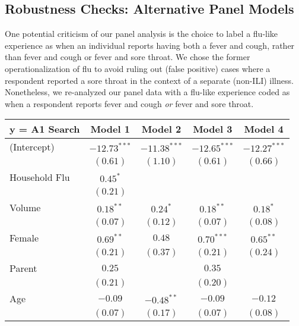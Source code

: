\documentclass[12pt]{article}
\begin{document}
\subsection{Robustness Checks: Alternative Panel Models}

One potential criticism of our panel analysis is the choice to label a flu-like experience as when an individual reports having both a fever and cough, rather than fever and cough or fever and sore throat. We chose the former operationalization of flu to avoid ruling out (false positive) cases where a respondent reported a sore throat in the context of a separate (non-ILI) illness. Nonetheless, we re-analyzed our panel data with a flu-like experience coded as when a respondent reports fever and cough \emph{or} fever and sore throat.

\begin{table}[h!]
\begin{center}
\begin{tabular}{l c c c c }
\hline
y = A1 Search & Model 1 & Model 2 & Model 3 & Model 4 \\
\hline
(Intercept)    & $-12.73^{***}$ & $-11.38^{***}$ & $-12.65^{***}$ & $-12.27^{***}$ \\
               & $(0.61)$       & $(1.10)$       & $(0.61)$       & $(0.66)$       \\
Household Flu  & $0.45^{*}$     &                &                &                \\
               & $(0.21)$       &                &                &                \\
Volume         & $0.18^{**}$    & $0.24^{*}$     & $0.18^{**}$    & $0.18^{*}$     \\
               & $(0.07)$       & $(0.12)$       & $(0.07)$       & $(0.08)$       \\
Female         & $0.69^{**}$    & $0.48$         & $0.70^{***}$   & $0.65^{**}$    \\
               & $(0.21)$       & $(0.37)$       & $(0.21)$       & $(0.24)$       \\
Parent         & $0.25$         &                & $0.35$         &                \\
               & $(0.21)$       &                & $(0.20)$       &                \\
Age            & $-0.09$        & $-0.48^{**}$   & $-0.09$        & $-0.12$        \\
               & $(0.07)$       & $(0.17)$       & $(0.07)$       & $(0.08)$       \\

\end{tabular}
\end{center}
\end{table}
\end{document}
